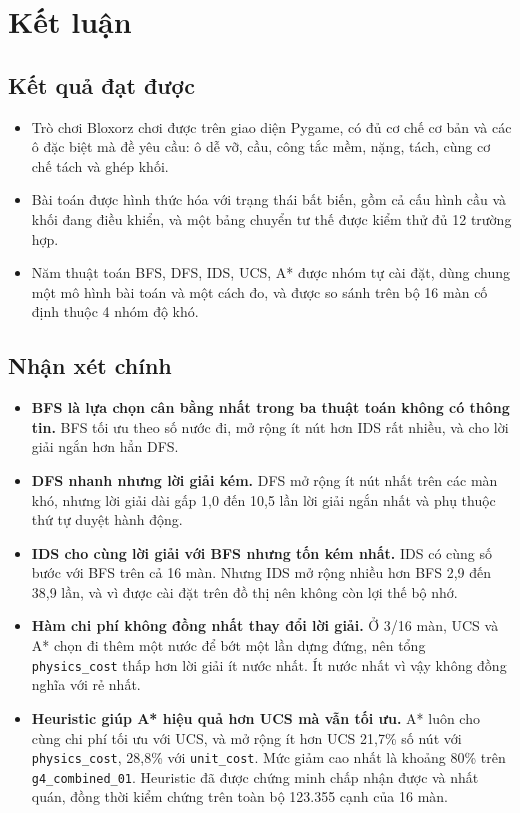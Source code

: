 \section{Kết luận}

\subsection{Kết quả đạt được}

\begin{itemize}
\item Trò chơi Bloxorz chơi được trên giao diện Pygame, có đủ cơ chế cơ bản và các ô đặc biệt mà đề yêu cầu: ô dễ vỡ, cầu, công tắc mềm, nặng, tách, cùng cơ chế tách và ghép khối.
\item Bài toán được hình thức hóa với trạng thái bất biến, gồm cả cấu hình cầu và khối đang điều khiển, và một bảng chuyển tư thế được kiểm thử đủ 12 trường hợp.
\item Năm thuật toán BFS, DFS, IDS, UCS, A* được nhóm tự cài đặt, dùng chung một mô hình bài toán và một cách đo, và được so sánh trên bộ 16 màn cố định thuộc 4 nhóm độ khó.
\end{itemize}

\subsection{Nhận xét chính}

\begin{itemize}
\item \textbf{BFS là lựa chọn cân bằng nhất trong ba thuật toán không có thông tin.} BFS tối ưu theo số nước đi, mở rộng ít nút hơn IDS rất nhiều, và cho lời giải ngắn hơn hẳn DFS.
\item \textbf{DFS nhanh nhưng lời giải kém.} DFS mở rộng ít nút nhất trên các màn khó, nhưng lời giải dài gấp 1,0 đến 10,5 lần lời giải ngắn nhất và phụ thuộc thứ tự duyệt hành động.
\item \textbf{IDS cho cùng lời giải với BFS nhưng tốn kém nhất.} IDS có cùng số bước với BFS trên cả 16 màn. Nhưng IDS mở rộng nhiều hơn BFS 2,9 đến 38,9 lần, và vì được cài đặt trên đồ thị nên không còn lợi thế bộ nhớ.
\item \textbf{Hàm chi phí không đồng nhất thay đổi lời giải.} Ở 3/16 màn, UCS và A* chọn đi thêm một nước để bớt một lần dựng đứng, nên tổng \texttt{physics\_\allowbreak{}cost} thấp hơn lời giải ít nước nhất. Ít nước nhất vì vậy không đồng nghĩa với rẻ nhất.
\item \textbf{Heuristic giúp A* hiệu quả hơn UCS mà vẫn tối ưu.} A* luôn cho cùng chi phí tối ưu với UCS, và mở rộng ít hơn UCS 21,7\% số nút với \texttt{physics\_\allowbreak{}cost}, 28,8\% với \texttt{unit\_\allowbreak{}cost}. Mức giảm cao nhất là khoảng 80\% trên \texttt{g4\_\allowbreak{}combined\_\allowbreak{}01}. Heuristic đã được chứng minh chấp nhận được và nhất quán, đồng thời kiểm chứng trên toàn bộ 123.355 cạnh của 16 màn.
\end{itemize}

